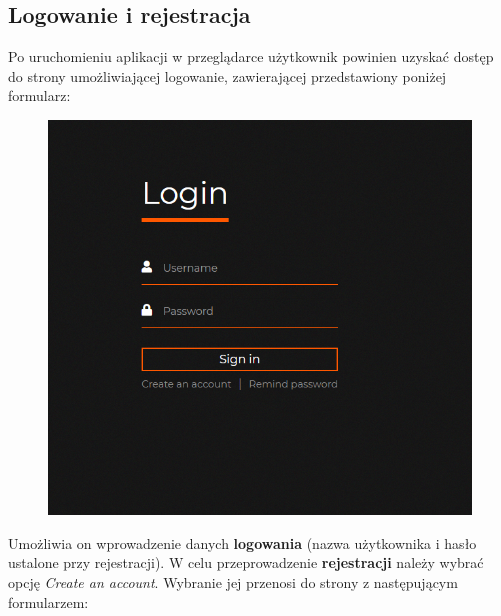 \documentclass[12pt] {article}
\begin{document}
\subsection{Logowanie i rejestracja}
Po uruchomieniu aplikacji w przeglądarce użytkownik powinien uzyskać dostęp do strony umożliwiającej logowanie, zawierającej przedstawiony poniżej formularz:
\begin{figure}[H]
\centering
\includegraphics[scale=0.5]{res/3_logowanie}
\end{figure}
Umożliwia on wprowadzenie danych \textbf{logowania} (nazwa użytkownika i hasło ustalone przy rejestracji). W celu przeprowadzenie \textbf{rejestracji} należy wybrać opcję \emph{Create an account}. Wybranie jej przenosi do strony z następującym formularzem:
\end{document}
